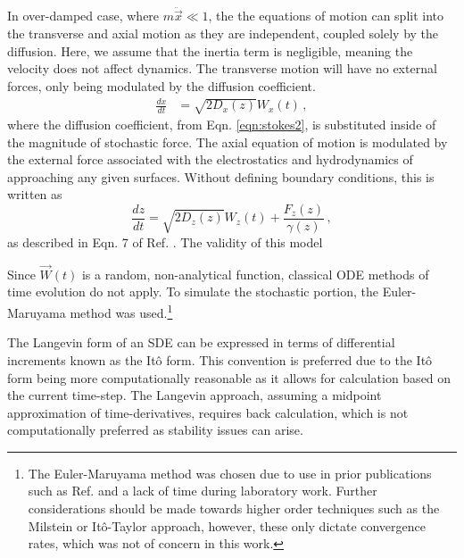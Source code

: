 In over-damped case, where $m \ddot{\vec{x}} \ll 1$, the  the equations of motion can split into the transverse and axial motion as they are independent, coupled solely by the diffusion. Here, we assume that the inertia term is negligible, meaning the velocity does not affect dynamics. The transverse motion will have no external forces, only being modulated by the diffusion coefficient.
\begin{equation} \label{eqn:EOM}
    \begin{aligned}
        \frac{dx}{dt} &= \sqrt{2D_x(z)} W_x(t)\,,
    \end{aligned}
\end{equation}
where the diffusion coefficient, from Eqn. \ref{eqn:stokes2}, is substituted inside of the magnitude of stochastic force. The axial equation of motion is modulated by the external force associated with the electrostatics and hydrodynamics of approaching any given surfaces. Without defining boundary conditions, this is written as
\begin{equation}
    \frac{dz}{dt} = \sqrt{2D_z(z)} W_z(t) + \frac{F_z(z)}{\gamma(z)}\,,
\end{equation}
as described in Eqn. 7 of Ref. \cite{millanNumericalSimulationsConfined2023}. The validity of this model 

Since $\vec{W}(t)$ is a random, non-analytical function, classical ODE methods of time evolution do not apply. To simulate the stochastic portion, the Euler-Maruyama method was used.\footnote{The Euler-Maruyama method was chosen due to use in prior publications such as Ref. \cite{millanNumericalSimulationsConfined2023} and a lack of time during laboratory work. Further considerations should be made towards higher order techniques such as the Milstein or Itô-Taylor approach, however, these only dictate convergence rates, which was not of concern in this work. } 

The Langevin form of an SDE can be expressed in terms of differential increments known as the Itô form. This convention is preferred due to the Itô form being more computationally reasonable as it allows for calculation based on the current time-step. The Langevin approach, assuming a midpoint approximation of time-derivatives, requires back calculation, which is not computationally preferred as stability issues can arise. 

